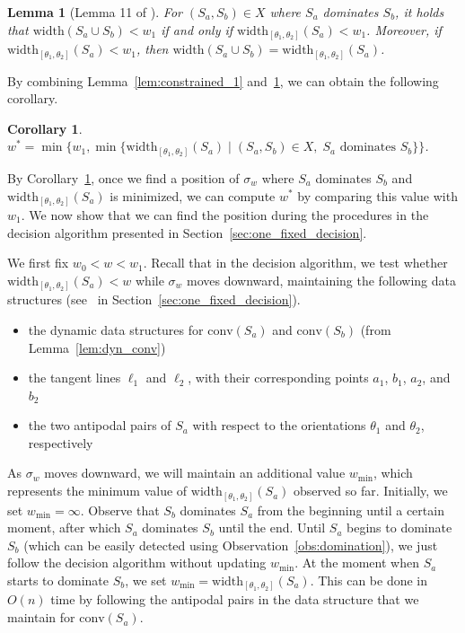 \documentclass[10pt,a4paper]{article}
\newtheorem{lemma}[theorem]{Lemma}
\newtheorem{corollary}[theorem]{Corollary}
\theoremstyle{star}
\theoremstyle{claimstar}
\newcommand{\width}{\ensuremath{\mathrm{width}}}
\newcommand{\conv}{\ensuremath{\mathrm{conv}}}
\begin{document}
\begin{lemma}[Lemma 11 of \cite{ahn2024constrained}]
    \label{lem:constrained_2}
    For $(S_a,  S_b) \in X$ where $S_a$ dominates $S_b$, it holds that $\width(S_a \cup S_b) < w_1$
    if and only if $\width_{[\theta_1, \theta_2]}(S_a) < w_1$. 
    Moreover, if $\width_{[\theta_1, \theta_2]}(S_a) < w_1$, 
    then $\width(S_a \cup S_b)  =\width_{[\theta_1, \theta_2]}(S_a)$.
\end{lemma}

By combining Lemma~\ref{lem:constrained_1} and~\ref{lem:constrained_2}, we can obtain the following corollary.  

\begin{corollary}
    \label{cor:one_fixed_idea}
    $w^* = \min\{ w_1,  \min \{\width_{[\theta_1, \theta_2]}(S_a) \mid (S_a, S_b) \in X, \; S_a \textrm{ dominates } S_b\} \}$. 
\end{corollary}

By Corollary~\ref{cor:one_fixed_idea}, 
once we find a position of $\sigma_w$ where $S_a$ dominates $S_b$ and $\width_{[\theta_1, \theta_2]}(S_a)$ is minimized,
we can compute $w^*$ by comparing this value with $w_1$.
We now show that we can find the position during the procedures in the decision algorithm presented in Section~\ref{sec:one_fixed_decision}. 


We first fix $w_0 < w < w_1$. 
Recall that in the decision algorithm, we test whether $\width_{[\theta_1, \theta_2]}(S_a) < w$ while $\sigma_w$ moves downward, maintaining the following data structures
(see~\emph{} in Section~\ref{sec:one_fixed_decision}).

\begin{itemize}
    \item the dynamic data structures for $\conv(S_a)$ and $\conv(S_b)$ (from Lemma~\ref{lem:dyn_conv})
    \item the tangent lines $\ell_1$ and $\ell_2$, with their corresponding points $a_1$, $b_1$, $a_2$, and $b_2$
    \item the two antipodal pairs of $S_a$ with respect to the orientations $\theta_1$ and $\theta_2$, respectively
\end{itemize}

As $\sigma_w$ moves downward, we will maintain an additional value $w_{\min}$, which represents the minimum value of $\width_{[\theta_1, \theta_2]}(S_a)$ observed so far. 
Initially, we set $w_{\min} = \infty$.
Observe that $S_b$ dominates $S_a$ from the beginning until a certain moment, after which $S_a$ dominates $S_b$ until the end. 
Until $S_a$ begins to dominate $S_b$ (which can be easily detected using Observation~\ref{obs:domination}), we just follow the decision algorithm without updating $w_{\min}$. 
At the moment when $S_a$ starts to dominate $S_b$, we set  $w_{\min} = \width_{[\theta_1, \theta_2]}(S_a)$. 
This can be done in $O(n)$ time by following the antipodal pairs in the data structure that we maintain for $\conv(S_a)$.
\end{document}
